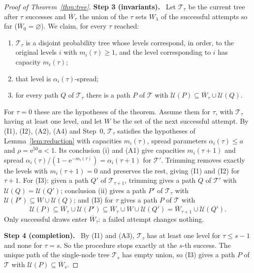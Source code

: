\documentclass[11pt]{article}
\numberwithin{equation}{section}
\newcommand{\TT}{\mathcal T}
\newcommand{\UU}{\mathcal U}
\newcommand{\ee}{\mathrm e}
\newcommand{\step}[2]{\par\medskip\noindent\textbf{Step #1 (#2).}\ }
\begin{document}
\begin{proof}[Proof of Theorem~\ref{thm:tree}]
\step{3}{invariants}
Let $\TT_\tau$ be the current tree after $\tau$ successes and
$\overline W_\tau$ the union of the $\tau$ sets $W_\lambda$ of the
successful attempts so far ($\overline W_0=\varnothing$). We claim, for
every $\tau$ reached:
\begin{enumerate}[label=(I\arabic*),leftmargin=2.6em,itemsep=2pt]
 \item $\TT_\tau$ is a disjoint probability tree whose levels correspond,
 in order, to the original levels $i$ with $m_i(\tau)\ge1$, and the level
 corresponding to $i$ has capacity $m_i(\tau)$;
 \item that level is $\alpha_i(\tau)$-spread;
 \item for every path $Q$ of $\TT_\tau$ there is a path $P$ of $\TT$
 with $\UU(P)\subseteq\overline W_\tau\cup\UU(Q)$.
\end{enumerate}
For $\tau=0$ these are the hypotheses of the theorem. Assume them for
$\tau$, with $\TT_\tau$ having at least one level, and let $W$ be the
set of the next successful attempt. By (I1), (I2), (A2), (A4) and
Step~0, $\TT_\tau$ satisfies the hypotheses of
Lemma~\ref{lem:reduction} with capacities $m_i(\tau)$, spread
parameters $\alpha_i(\tau)\le a$ and $\rho=\ee^{50}a<1$. Its conclusion
(i) and (A1) give capacities $m_i(\tau+1)$ and spread
$\alpha_i(\tau)/(1-\ee^{-m_i(\tau)})=\alpha_i(\tau+1)$ for $\TT'$.
Trimming removes exactly the levels with $m_i(\tau+1)=0$ and preserves
the rest, giving (I1) and (I2) for $\tau+1$. For (I3): given a path
$Q'$ of $\TT_{\tau+1}$, trimming gives a path $Q$ of $\TT'$ with
$\UU(Q)=\UU(Q')$; conclusion (ii) gives a path $P'$ of $\TT_\tau$ with
$\UU(P')\subseteq W\cup\UU(Q)$; and (I3) for $\tau$ gives a path $P$ of
$\TT$ with
\[
 \UU(P)\subseteq\overline W_\tau\cup\UU(P')
 \subseteq\overline W_\tau\cup W\cup\UU(Q')
 =\overline W_{\tau+1}\cup\UU(Q').
\]
Only successful draws enter $\overline W_\tau$: a failed attempt changes
nothing.

\step{4}{completion}
By (I1) and (A3), $\TT_\tau$ has at least one level for $\tau\le s-1$
and none for $\tau=s$. So the procedure stops exactly at the $s$-th
success. The unique path of the single-node tree $\TT_s$ has empty
union, so (I3) gives a path $P$ of $\TT$ with
$\UU(P)\subseteq\overline W_s$.


\end{proof}
\end{document}
